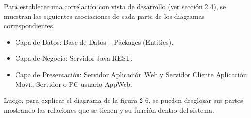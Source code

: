 \documentclass{memoria}
\begin{document}
Para establecer una correlación con vista de desarrollo (ver sección 2.4), se muestran las siguientes asociaciones de cada parte de los diagramas correspondientes.

\begin{itemize}
\item Capa de Datos: Base de Datos – Packages (Entities).
\item Capa de Negocio: Servidor Java REST.
\item Capa de Presentación: Servidor Aplicación Web y Servidor Cliente Aplicación Movil, Servidor o PC usuario AppWeb.
\end{itemize}

Luego, para explicar el diagrama de la figura 2-6, se pueden desglozar sus partes mostrando las relaciones que se tienen y su función dentro del sistema.
\end{document}
